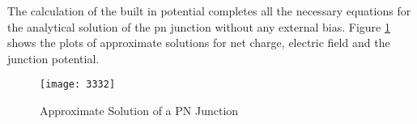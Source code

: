 \begin{doublespace}
The calculation of the built in potential completes all the necessary equations for the analytical solution of the pn junction without any external bias. Figure \ref{pnplt} shows the plots of approximate solutions for net charge, electric field and the junction potential.

\begin{figure}
\centering
\texttt{[image: 3332]}
\caption{Approximate Solution of a PN Junction} 
\label{pnplt}
\end{figure}

\end{doublespace}

